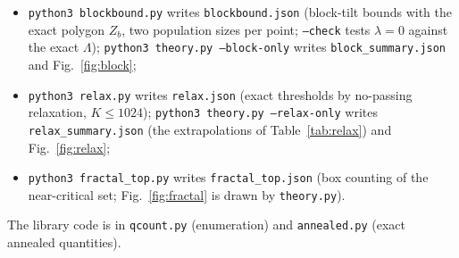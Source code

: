 \documentclass[10pt,a4paper]{article}
\begin{document}
\begin{itemize}
\item \texttt{python3 blockbound.py} writes \texttt{blockbound.json} (block-tilt bounds with the exact polygon $Z_b$, two population sizes per point; \texttt{--check} tests $\lambda=0$ against the exact $\Lambda$); \texttt{python3 theory.py --block-only} writes \texttt{block\_summary.json} and Fig.~\ref{fig:block};
\item \texttt{python3 relax.py} writes \texttt{relax.json} (exact thresholds by no-passing relaxation, $K\le1024$); \texttt{python3 theory.py --relax-only} writes \texttt{relax\_summary.json} (the extrapolations of Table~\ref{tab:relax}) and Fig.~\ref{fig:relax};
\item \texttt{python3 fractal\_top.py} writes \texttt{fractal\_top.json} (box counting of the near-critical set; Fig.~\ref{fig:fractal} is drawn by \texttt{theory.py}).
\end{itemize}
The library code is in \texttt{qcount.py} (enumeration) and \texttt{annealed.py} (exact annealed quantities).
\end{document}

